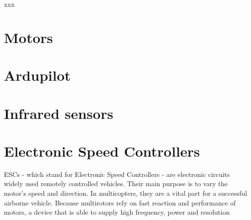 xxx

\section{Motors}
\section{Ardupilot}
\section{Infrared sensors}
\section{Electronic Speed Controllers}
ESCs - which stand for Electronic Speed Controllers - are electronic circuits widely used remotely controlled vehicles. Their main purpose is to vary the motor's speed and direction. %
\newline
In multicopters, they are a vital part for a successful airborne vehicle. Because multirotors rely on fast reaction and performance of motors, a device that is able to supply high frequency, power and resolution